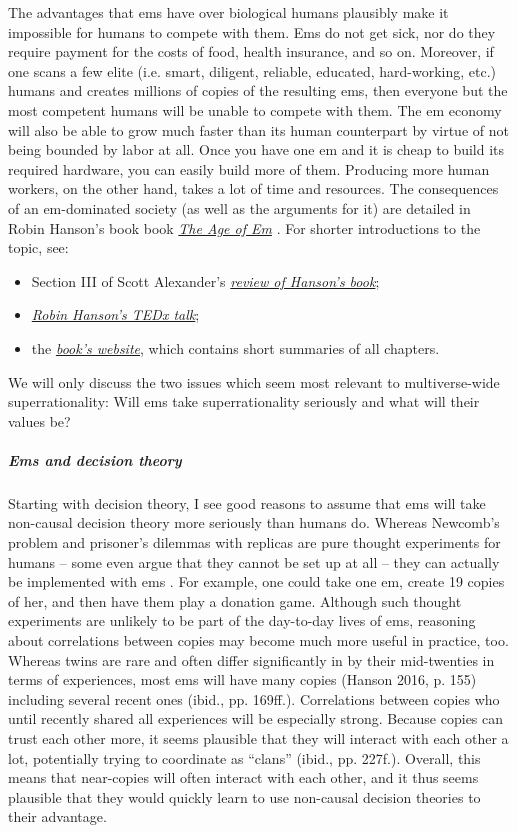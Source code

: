 \documentclass[]{article}
\let\oldsubparagraph\subparagraph
\renewcommand{\subparagraph}[1]{\oldsubparagraph{#1}\mbox{}}
\begin{document}
The advantages that ems have over biological humans plausibly make it
impossible for humans to compete with them. Ems do not get sick, nor do
they require payment for the costs of food, health insurance, and so on.
Moreover, if one scans a few elite (i.e. smart, diligent, reliable,
educated, hard-working, etc.) humans and creates millions of copies of
the resulting ems, then everyone but the most competent humans will be
unable to compete with them. The em economy will also be able to grow
much faster than its human counterpart by virtue of not being bounded by
labor at all. Once you have one em and it is cheap to build its required
hardware, you can easily build more of them. Producing more human
workers, on the other hand, takes a lot of time and resources. The
consequences of an em-dominated society (as well as the arguments for
it) are detailed in Robin Hanson's book book
\href{http://ageofem.com/}{\emph{The Age of Em}} \parencite{Hanson2016-yn}. For shorter
introductions to the topic, see:

\begin{itemize}
\item
  Section III of Scott Alexander's
  \href{http://slatestarcodex.com/2016/05/28/book-review-age-of-em/}{\emph{review
  of Hanson's book}};
\item
  \href{https://www.youtube.com/watch?v=9qcIsjrHENU}{\emph{Robin
  Hanson's TEDx talk}};
\item
  the \href{http://ageofem.com/}{\emph{book's website}}, which contains
  short summaries of all chapters.
\end{itemize}

We will only discuss the two issues which seem most relevant to
multiverse-wide superrationality: Will ems take superrationality
seriously and what will their values be?

\subparagraph{Ems and decision theory}\label{ems-and-decision-theory}

Starting with decision theory, I see good reasons to assume that ems
will take non-causal decision theory more seriously than humans do.
Whereas Newcomb's problem and prisoner's dilemmas with replicas are pure
thought experiments for humans -- some even argue that they cannot be
set up at all \parencite{Binmore2007-mk} -- they can actually be implemented with ems
\parencite{Yudkowsky2010-xo}. For example, one could take
one em, create 19 copies of her, and then have them play a donation
game. Although such thought experiments are unlikely to be part of the
day-to-day lives of ems, reasoning about correlations between copies may
become much more useful in practice, too. Whereas twins are rare and
often differ significantly in by their mid-twenties in terms of
experiences, most ems will have many copies (Hanson 2016, p. 155)
including several recent ones (ibid., pp. 169ff.). Correlations between
copies who until recently shared all experiences will be especially
strong. Because copies can trust each other more, it seems plausible
that they will interact with each other a lot, potentially trying to
coordinate as ``clans'' (ibid., pp. 227f.). Overall, this means that
near-copies will often interact with each other, and it thus seems
plausible that they would quickly learn to use non-causal decision
theories to their advantage.
\end{document}

